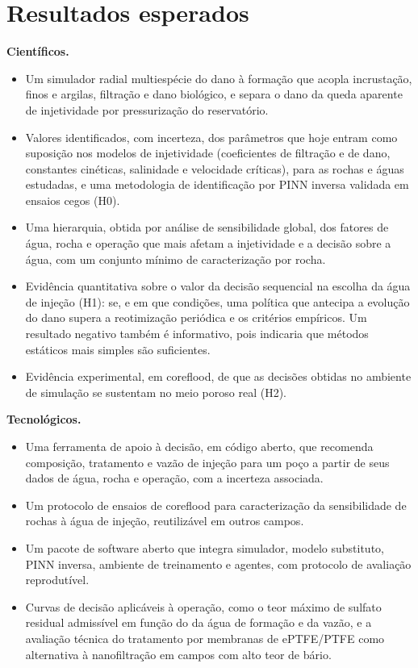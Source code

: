 \documentclass[11pt,a4paper]{article}
\newcommand{\itemedital}[1]{}
\begin{document}
\section{Resultados esperados}\label{sec:resultados}\itemedital{2.16 XV}
\textbf{Científicos.}
\begin{itemize}
  \item Um simulador radial multiespécie do dano à formação que acopla incrustação, finos e
        argilas, filtração e dano biológico, e separa o dano da queda aparente de
        injetividade por pressurização do reservatório.
  \item Valores identificados, com incerteza, dos parâmetros que hoje entram como
        suposição nos modelos de injetividade (coeficientes de filtração e de dano,
        constantes cinéticas, salinidade e velocidade críticas), para as rochas e águas
        estudadas, e uma metodologia de identificação por PINN inversa validada em
        ensaios cegos (H0).
  \item Uma hierarquia, obtida por análise de sensibilidade global, dos fatores de água,
        rocha e operação que mais afetam a injetividade e a decisão sobre a água, com um
        conjunto mínimo de caracterização por rocha.
  \item Evidência quantitativa sobre o valor da decisão sequencial na escolha da água de
        injeção (H1): se, e em que condições, uma política que antecipa a evolução do dano
        supera a reotimização periódica e os critérios empíricos. Um resultado negativo
        também é informativo, pois indicaria que métodos estáticos mais simples são
        suficientes.
  \item Evidência experimental, em coreflood, de que as decisões obtidas no ambiente de
        simulação se sustentam no meio poroso real (H2).
\end{itemize}

\textbf{Tecnológicos.}
\begin{itemize}
  \item Uma ferramenta de apoio à decisão, em código aberto, que recomenda composição,
        tratamento e vazão de injeção para um poço a partir de seus dados de água, rocha e
        operação, com a incerteza associada.
  \item Um protocolo de ensaios de coreflood para caracterização da sensibilidade de rochas
        à água de injeção, reutilizável em outros campos.
  \item Um pacote de software aberto que integra simulador, modelo substituto, PINN
        inversa, ambiente de treinamento e agentes, com protocolo de avaliação reprodutível.
  \item Curvas de decisão aplicáveis à operação, como o teor máximo de sulfato residual
        admissível em função do  da água de formação e da vazão, e a avaliação
        técnica do tratamento por membranas de ePTFE/PTFE como alternativa à
        nanofiltração em campos com alto teor de bário.
\end{itemize}
\end{document}
